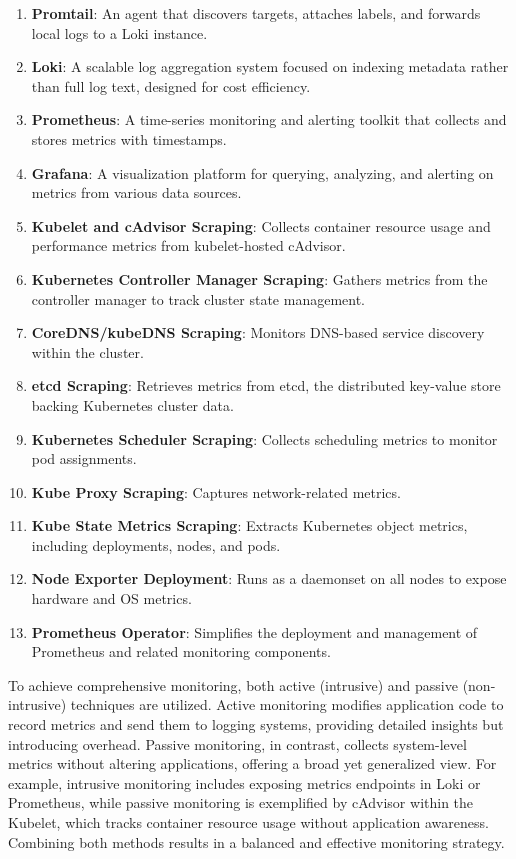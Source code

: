 \begin{enumerate}
    \item \textbf{Promtail}: An agent that discovers targets, attaches labels, and forwards local logs to a Loki instance.
    \item \textbf{Loki}: A scalable log aggregation system focused on indexing metadata rather than full log text, designed for cost efficiency.
    \item \textbf{Prometheus}: A time-series monitoring and alerting toolkit that collects and stores metrics with timestamps.
    \item \textbf{Grafana}: A visualization platform for querying, analyzing, and alerting on metrics from various data sources.
    \item \textbf{Kubelet and cAdvisor Scraping}: Collects container resource usage and performance metrics from kubelet-hosted cAdvisor.
    \item \textbf{Kubernetes Controller Manager Scraping}: Gathers metrics from the controller manager to track cluster state management.
    \item \textbf{CoreDNS/kubeDNS Scraping}: Monitors DNS-based service discovery within the cluster.
    \item \textbf{etcd Scraping}: Retrieves metrics from etcd, the distributed key-value store backing Kubernetes cluster data.
    \item \textbf{Kubernetes Scheduler Scraping}: Collects scheduling metrics to monitor pod assignments.
    \item \textbf{Kube Proxy Scraping}: Captures network-related metrics.
    \item \textbf{Kube State Metrics Scraping}: Extracts Kubernetes object metrics, including deployments, nodes, and pods.
    \item \textbf{Node Exporter Deployment}: Runs as a daemonset on all nodes to expose hardware and OS metrics.
    \item \textbf{Prometheus Operator}: Simplifies the deployment and management of Prometheus and related monitoring components.
\end{enumerate}

To achieve comprehensive monitoring, both active (intrusive) and passive (non-intrusive) techniques are utilized. Active monitoring modifies application code to record metrics and send them to logging systems, providing detailed insights but introducing overhead. Passive monitoring, in contrast, collects system-level metrics without altering applications, offering a broad yet generalized view. For example, intrusive monitoring includes exposing metrics endpoints in Loki or Prometheus, while passive monitoring is exemplified by cAdvisor within the Kubelet, which tracks container resource usage without application awareness. Combining both methods results in a balanced and effective monitoring strategy.

